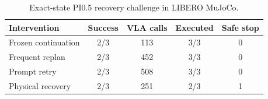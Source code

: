 \begin{table}
\caption{Exact-state PI0.5 recovery challenge in LIBERO MuJoCo.}
\label{tab:recovery_challenge}
\centering\small
\begin{tabular}{lcccc}
\toprule
Intervention & Success & VLA calls & Executed & Safe stop \\
\midrule
Frozen continuation & 2/3 & 113 & 3/3 & 0 \\
Frequent replan & 2/3 & 452 & 3/3 & 0 \\
Prompt retry & 2/3 & 508 & 3/3 & 0 \\
Physical recovery & 2/3 & 251 & 2/3 & 1 \\
\bottomrule
\end{tabular}
\end{table}
